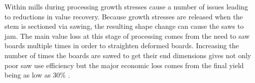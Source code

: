 Within mills during processing growth stresses cause a number of issues leading
to reductions in value recovery. Because growth stresses are released when the
stem is sectioned via sawing, the resulting shape change
can cause the saws to jam. The main value loss at this stage of processing comes
from the need to saw boards multiple times in order to straighten deformed boards.
Increasing the number of times the boards are sawed to get their end dimensions
gives not only poor saw use efficiency but the major economic loss comes from the
final yield being as low as 30\% \cite{yamamoto2007slides}.